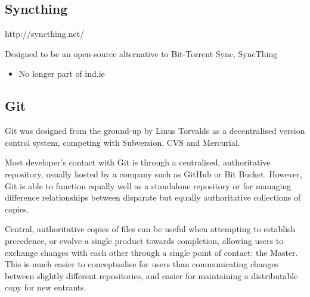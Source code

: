 \documentclass[12pt,a4paper,]{adreport}
\begin{document}
\subsection{Syncthing}\label{syncthing}

http://syncthing.net/

Designed to be an open-source alternative to Bit-Torrent Sync, SyncThing

\begin{itemize}
\itemsep1pt\parskip0pt
\item
  No longer part of ind.ie
\end{itemize}

\subsection{Git}\label{git}

Git was designed from the ground-up by Linus Torvalds as a decentralised
version control system, competing with Subversion, CVS and Mercurial.

Most developer's contact with Git is through a centralised,
authoritative repository, usually hosted by a company such as GitHub or
Bit Bucket. However, Git is able to function equally well as a
standalone repository or for managing difference relationships between
disparate but equally authoritative collections of copies.

Central, authoritative copies of files can be useful when attempting to
establish precedence, or evolve a single product towards completion,
allowing users to exchange changes with each other through a single
point of contact: the Master. This is much easier to conceptualise for
users than communicating changes between slightly different
repositories, and easier for maintaining a distributable copy for new
entrants.
\end{document}
